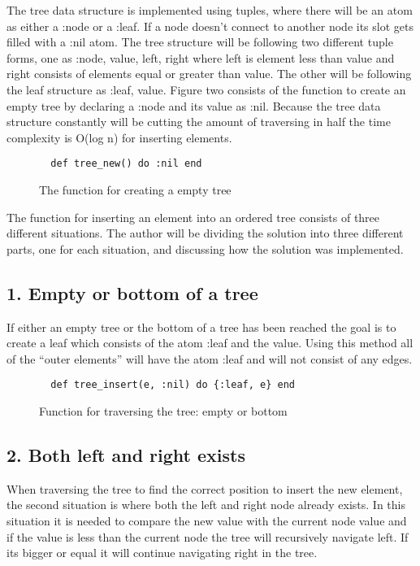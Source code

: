 \documentclass[a4paper,11pt]{article}
\begin{document}
The tree data structure is implemented using tuples, where there will be an atom as either a :node or a :leaf. If a node doesn't connect to another node its slot gets filled with a :nil atom. The tree structure will be following two different tuple forms, one as {:node, value, left, right} where left is element less than value and right consists of elements equal or greater than value. The other will be following the leaf structure as {:leaf, value}. Figure two consists of the function to create an empty tree by declaring a :node and its value as :nil. Because the tree data structure constantly will be cutting the amount of traversing in half the time complexity is O(log n) for inserting elements.

\begin{figure}[H]
\begin{verbatim}
  def tree_new() do :nil end
\end{verbatim}
\caption{The function for creating a empty tree}
\label{Figure:2}
\end{figure}

The function for inserting an element into an ordered tree consists of three different situations. The author will be dividing the solution into three different parts, one for each situation, and discussing how the solution was implemented.

\subsection*{1. Empty or bottom of a tree}
If either an empty tree or the bottom of a tree has been reached the goal is to create a leaf which consists of the atom :leaf and the value. Using this method all of the “outer elements” will have the atom :leaf and will not consist of any edges.

\begin{figure}[H]
\begin{verbatim}
  def tree_insert(e, :nil) do {:leaf, e} end
\end{verbatim}
\caption{Function for traversing the tree: empty or bottom}
\label{Figure:3}
\end{figure}


\subsection*{2. Both left and right exists}
When traversing the tree to find the correct position to insert the new element, the second situation is where both the left and right node already exists. In this situation it is needed to compare the new value with the current node value and if the value is less than the current node the tree will recursively navigate left. If its bigger or equal it will continue navigating right in the tree.
\end{document}
